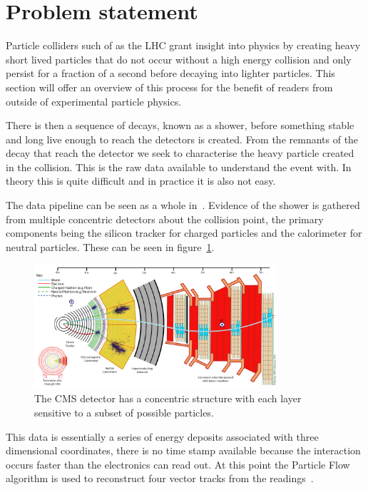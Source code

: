 \section{Problem statement}
Particle colliders such of as the LHC grant insight into physics by
creating heavy short lived particles that do not occur without a high energy collision
and only persist for a fraction of a second before decaying into lighter particles.
This section will offer an overview of this process for the benefit
of readers from outside of experimental particle physics.

There is then a sequence of decays, known as a shower, before something
stable and long live enough to reach the detectors is created.
From the remnants of the decay that reach the detector we seek
to characterise the heavy particle created in the collision.
This is the raw data available to understand the event with.
In theory this is quite difficult and in practice it is also not easy.

The data pipeline can be seen as a whole in~\cite{Stoye_DeepCMS2018, Schramm:2291608}.
Evidence of the shower is gathered from multiple concentric detectors about the collision point, the primary components being the 
silicon tracker for charged particles and the calorimeter for neutral particles. 
These can be seen in figure~\ref{fig:lit_CMSdetector}.
\begin{figure}
    \centering
    \includegraphics[width=0.8\textwidth]{images/lit_CMSdetector.png}
    \caption{The CMS detector has a concentric structure with each layer sensitive to a subset of possible particles.
             \cite{Stoye_DeepCMS2018}}
    \label{fig:lit_CMSdetector}
\end{figure}
This data is essentially a series of energy deposits associated with three dimensional coordinates,
there is no time stamp available because the interaction occurs faster than the electronics can read out.
At this point the Particle Flow algorithm is used to reconstruct four vector tracks from the readings~\cite{Beaudette_particleFlow2013}.

